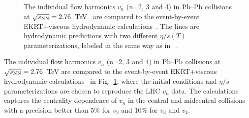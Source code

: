 \begin{figure}[h]
\begin{center}
        \caption{The individual flow harmonics $v_n$ (n=2, 3 and 4) in $\textnormal{Pb--Pb}$ collisions at $\sqrt{s_{\textnormal{NN}}}=2.76$~TeV~\cite{Adam:2016izf} are compared to the event-by-event EKRT+viscous hydrodynamic calculations~\cite{Niemi:2015qia}. The lines are hydrodynamic predictions with two different $\eta/s(T)$ parameterizations, labeled in the same way as in ~\cite{Niemi:2015qia}.}
        \label{fig:Figure_8}
              \end{center}
\end{figure}

The individual flow harmonics $v_n$ (n=2, 3 and 4) in $\textnormal{Pb--Pb}$ collisions at $\sqrt{s_{\textnormal{NN}}}=2.76$~TeV are compared to the event-by-event EKRT+viscous hydrodynamic calculations~\cite{Niemi:2015qia} in Fig.~\ref{fig:Figure_8}, where the initial conditions and $\eta/s$ parameterizations are chosen to reproduce the LHC $v_n$ data.
The calculations captures the centrality dependence of $v_n$ in the central and midcentral collisions with a precision better than 5\% for $v_2$ and 10\% for $v_3$ and $v_4$.

